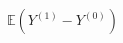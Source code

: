 \documentclass[preview]{standalone}
\begin{document}
\begin{align*}
\mathbb{E}( Y^{(1)}  -  Y^{(0)} )
\end{align*}
\end{document}
